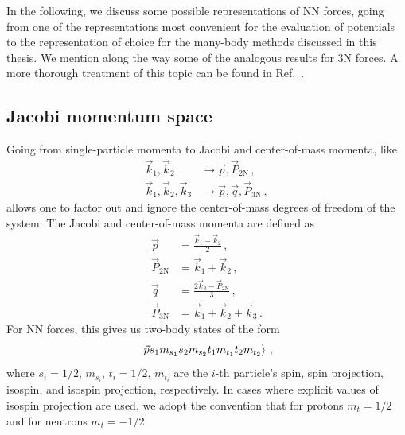 In the following, we discuss some possible representations of NN forces,
going from one of the representations most convenient for the evaluation of potentials
to the representation of choice for the many-body methods discussed in this thesis.
We mention along the way some of the analogous results for 3N forces.
A more thorough treatment of this topic can be found in Ref.~\cite{Hebe20habi}.

\subsection{Jacobi momentum space}\label{sec:jacobi_ms_rep}

Going from single-particle momenta to Jacobi and center-of-mass momenta,
like
\begin{align}
  \vec{k}_1, \vec{k}_2 & \rightarrow \vec{p}, \vec{P}_{2\text{N}}\,, \\
  \vec{k}_1, \vec{k}_2,\vec{k}_3 & \rightarrow \vec{p}, \vec{q}, \vec{P}_{3\text{N}} \,,
\end{align}
allows one to factor out and ignore the center-of-mass degrees of freedom of the system.
The Jacobi and center-of-mass momenta are defined as
\begin{align}
  \vec{p} &= \frac{\vec{k}_1 - \vec{k}_2}{2}\,,\\
  \vec{P}_{2\text{N}} &= \vec{k}_1 + \vec{k}_2\,,\\
  \vec{q} &= \frac{2\vec{k}_3 - \vec{P}_{2\text{N}}}{3}\,,\\
  \vec{P}_{3\text{N}} &= \vec{k}_1 + \vec{k}_2 + \vec{k}_3\,.
\end{align}
For NN forces, this gives us two-body states of the form
\begin{equation}
  \ket{\vec{p} s_1 m_{s_1} s_2 m_{s_2} t_1 m_{t_1} t_2 m_{t_2}}\,,
\end{equation}
where $s_i=1/2$, $m_{s_i}$, $t_i=1/2$, $m_{t_i}$ are the $i$-th particle's
spin, spin projection, isospin, and isospin projection, respectively.
In cases where explicit values of isospin projection are used,
we adopt the convention that for protons $m_t=1/2$ and for neutrons $m_t=-1/2$.

